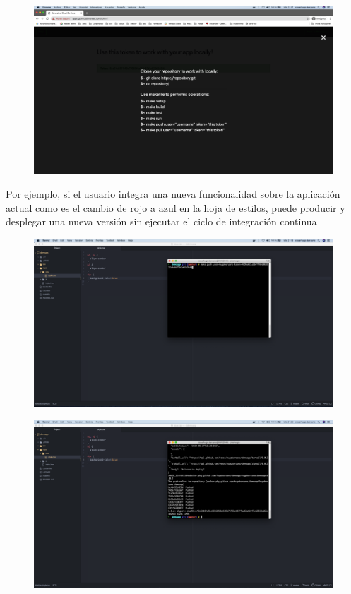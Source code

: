 \documentclass[a4paper,11pt]{book}
\begin{document}
   \begin{figure}[H]
\centering
\includegraphics[scale=0.2]{imagenes/casouso/3_4.png}
\caption{   }
\end{figure}

Por ejemplo, si el usuario integra una nueva funcionalidad sobre la aplicación actual como es el cambio de rojo a azul en la hoja de estilos, puede producir y desplegar una nueva versión sin ejecutar el ciclo de integración continua

   \begin{figure}[H]
\centering
\includegraphics[scale=0.2]{imagenes/casouso/3_5.png}
\caption{   }
\end{figure}

   \begin{figure}[H]
\centering
\includegraphics[scale=0.2]{imagenes/casouso/3_6.png}
\caption{   }
\end{figure}
\end{document}
